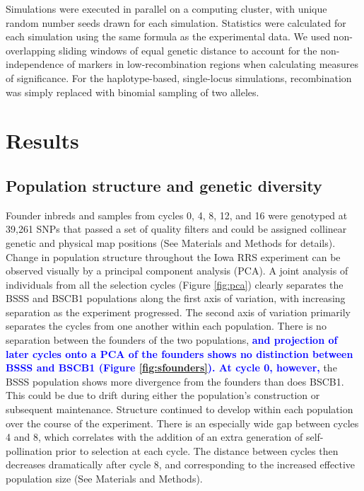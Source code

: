 \documentclass[twocolumn,twoside,letterpaper]{article}
\newcommand{\rev}[1]{\textcolor{blue}{\bf #1}}
\begin{document}
Simulations were executed in parallel on a computing cluster, with unique random number seeds drawn for each simulation. 
Statistics were calculated for each simulation using the same formula as the experimental data. 
We used non-overlapping sliding windows of equal genetic distance to account for the non-independence of markers in low-recombination regions when calculating measures of significance. 
For the haplotype-based, single-locus simulations, recombination was simply replaced with binomial sampling of two alleles.

\section*{Results}

\subsection*{Population structure and genetic diversity}
Founder inbreds and samples from cycles 0, 4, 8, 12, and 16 were genotyped at 39,261 SNPs that passed a set of quality filters and could be assigned collinear genetic and physical map positions (See Materials and Methods for details). 
Change in population structure throughout the Iowa RRS experiment can be observed visually by a principal component analysis (PCA). 
A joint analysis of individuals from all the selection cycles (Figure \ref{fig:pca}) clearly separates the BSSS and BSCB1 populations along the first axis of variation, with increasing separation as the experiment progressed. 
The second axis of variation primarily separates the cycles from one another within each population. 
There is no separation between the founders of the two populations, \rev{and projection of later cycles onto a PCA of the founders shows no distinction between BSSS and BSCB1 (Figure \ref{fig:sfounders}).
At cycle 0, however,} the BSSS population shows more divergence from the founders than does BSCB1. 
This could be due to drift during either the population’s construction or subsequent maintenance. 
Structure continued to develop within each population over the course of the experiment. 
There is an especially wide gap between cycles 4 and 8, which correlates with the addition of an extra generation of self-pollination prior to selection at each cycle. 
The distance between cycles then decreases dramatically after cycle 8, and corresponding to the increased effective population size (See Materials and Methods).
\end{document}

